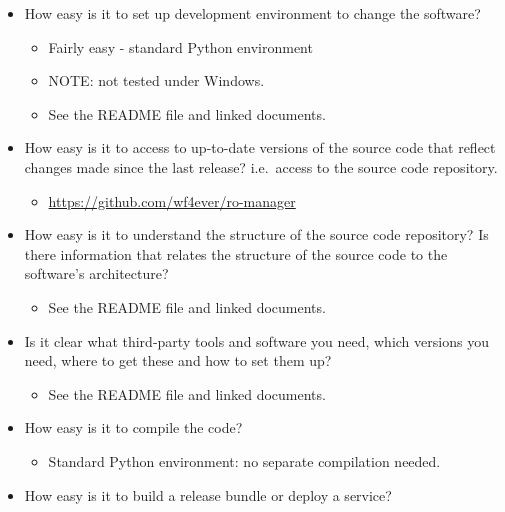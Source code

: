 \begin{itemize}
\itemsep1pt\parskip0pt
\item
  How easy is it to set up development environment to change the
  software?

  \begin{itemize}
  \itemsep1pt\parskip0pt
  \item
    Fairly easy - standard Python environment
  \item
    NOTE: not tested under Windows.
  \item
    See the README file and linked documents.
  \end{itemize}
\item
  How easy is it to access to up-to-date versions of the source code
  that reflect changes made since the last release? i.e.~access to the
  source code repository.

  \begin{itemize}
  \itemsep1pt\parskip0pt
  \item
    \url{https://github.com/wf4ever/ro-manager}
  \end{itemize}
\item
  How easy is it to understand the structure of the source code
  repository? Is there information that relates the structure of the
  source code to the software's architecture?

  \begin{itemize}
  \itemsep1pt\parskip0pt
  \item
    See the README file and linked documents.
  \end{itemize}
\item
  Is it clear what third-party tools and software you need, which
  versions you need, where to get these and how to set them up?

  \begin{itemize}
  \itemsep1pt\parskip0pt
  \item
    See the README file and linked documents.
  \end{itemize}
\item
  How easy is it to compile the code?

  \begin{itemize}
  \itemsep1pt\parskip0pt
  \item
    Standard Python environment: no separate compilation needed.
  \end{itemize}
\item
  How easy is it to build a release bundle or deploy a service?


\end{itemize}
